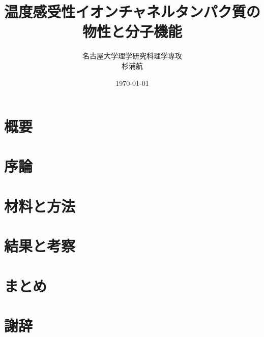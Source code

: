 \documentclass[a4paper, 14pt]{ltjsreport}
\title{温度感受性イオンチャネルタンパク質の物性と分子機能}
\author{名古屋大学理学研究科理学専攻\\杉浦航}
\date{\today}
\begin{document}
\maketitle

\chapter*{概要}


\tableofcontents
\clearpage

\chapter{序論}


\chapter{材料と方法}\label{chap:methods}


\chapter{結果と考察}


\chapter{まとめ}


\chapter{謝辞}


\printbibliography[title=参考文献]
\end{document}
